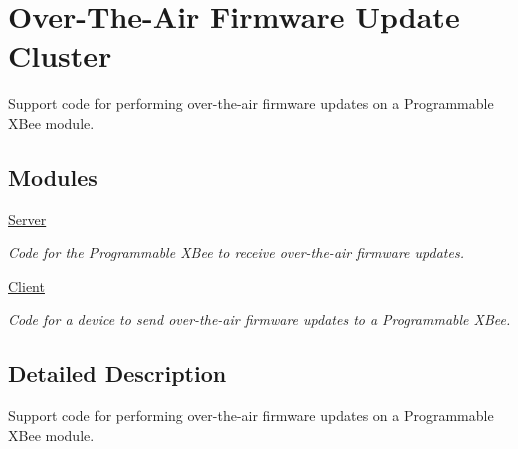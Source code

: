 \hypertarget{group__xbee__ota}{\section{Over-\/\-The-\/\-Air Firmware Update Cluster}
\label{group__xbee__ota}
}


Support code for performing over-\/the-\/air firmware updates on a Programmable X\-Bee module.  


\subsection*{Modules}
\begin{DoxyCompactItemize}
\item 
\hyperlink{group__xbee__ota__server}{Server}
\begin{DoxyCompactList}\small\item\em Code for the Programmable X\-Bee to receive over-\/the-\/air firmware updates. \end{DoxyCompactList}\item 
\hyperlink{group__xbee__ota__client}{Client}
\begin{DoxyCompactList}\small\item\em Code for a device to send over-\/the-\/air firmware updates to a Programmable X\-Bee. \end{DoxyCompactList}\end{DoxyCompactItemize}


\subsection{Detailed Description}
Support code for performing over-\/the-\/air firmware updates on a Programmable X\-Bee module. 